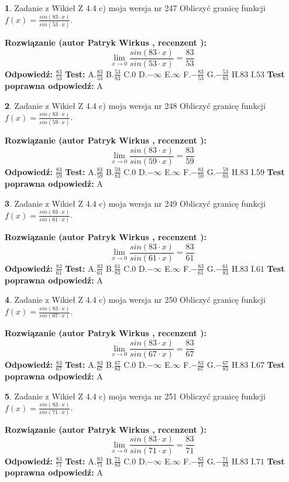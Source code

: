 \documentclass[12pt, a4paper]{article}
\theoremstyle{definition} %
\newtheorem{zad}{}
\newcommand{\zadStart}[1]{\begin{zad}#1\newline}
\newcommand{\zadStop}{\end{zad}}
\newcommand{\rozwStart}[2]{\noindent \textbf{Rozwiązanie (autor #1 , recenzent #2): }\newline}
\newcommand{\rozwStop}{\newline}
\newcommand{\odpStart}{\noindent \textbf{Odpowiedź:}\newline}
\newcommand{\odpStop}{\newline}
\newcommand{\testStart}{\noindent \textbf{Test:}\newline}
\newcommand{\testStop}{\newline}
\newcommand{\kluczStart}{\noindent \textbf{Test poprawna odpowiedź:}\newline}
\newcommand{\kluczStop}{\newline}
\begin{document}
\zadStart{Zadanie z Wikieł Z 4.4 c) moja wersja nr 247}
Obliczyć granicę funkcji $f(x)=\frac{sin(83\cdot x)}{sin(53\cdot x)}$.
\zadStop
\rozwStart{Patryk Wirkus}{}
$$\lim\limits_{x\to 0}\frac{sin(83\cdot x)}{sin(53\cdot x)}=
\frac{83}{53}$$
\rozwStop
\odpStart
$\frac{83}{53}$
\odpStop
\testStart
A.$\frac{83}{53}$
B.$\frac{53}{83}$
C.$0$
D.$-\infty$
E.$\infty$
F.$-\frac{83}{53}$
G.$-\frac{53}{83}$
H.$83$
I.$53$
\testStop
\kluczStart
A
\kluczStop



\zadStart{Zadanie z Wikieł Z 4.4 c) moja wersja nr 248}
Obliczyć granicę funkcji $f(x)=\frac{sin(83\cdot x)}{sin(59\cdot x)}$.
\zadStop
\rozwStart{Patryk Wirkus}{}
$$\lim\limits_{x\to 0}\frac{sin(83\cdot x)}{sin(59\cdot x)}=
\frac{83}{59}$$
\rozwStop
\odpStart
$\frac{83}{59}$
\odpStop
\testStart
A.$\frac{83}{59}$
B.$\frac{59}{83}$
C.$0$
D.$-\infty$
E.$\infty$
F.$-\frac{83}{59}$
G.$-\frac{59}{83}$
H.$83$
I.$59$
\testStop
\kluczStart
A
\kluczStop



\zadStart{Zadanie z Wikieł Z 4.4 c) moja wersja nr 249}
Obliczyć granicę funkcji $f(x)=\frac{sin(83\cdot x)}{sin(61\cdot x)}$.
\zadStop
\rozwStart{Patryk Wirkus}{}
$$\lim\limits_{x\to 0}\frac{sin(83\cdot x)}{sin(61\cdot x)}=
\frac{83}{61}$$
\rozwStop
\odpStart
$\frac{83}{61}$
\odpStop
\testStart
A.$\frac{83}{61}$
B.$\frac{61}{83}$
C.$0$
D.$-\infty$
E.$\infty$
F.$-\frac{83}{61}$
G.$-\frac{61}{83}$
H.$83$
I.$61$
\testStop
\kluczStart
A
\kluczStop



\zadStart{Zadanie z Wikieł Z 4.4 c) moja wersja nr 250}
Obliczyć granicę funkcji $f(x)=\frac{sin(83\cdot x)}{sin(67\cdot x)}$.
\zadStop
\rozwStart{Patryk Wirkus}{}
$$\lim\limits_{x\to 0}\frac{sin(83\cdot x)}{sin(67\cdot x)}=
\frac{83}{67}$$
\rozwStop
\odpStart
$\frac{83}{67}$
\odpStop
\testStart
A.$\frac{83}{67}$
B.$\frac{67}{83}$
C.$0$
D.$-\infty$
E.$\infty$
F.$-\frac{83}{67}$
G.$-\frac{67}{83}$
H.$83$
I.$67$
\testStop
\kluczStart
A
\kluczStop



\zadStart{Zadanie z Wikieł Z 4.4 c) moja wersja nr 251}
Obliczyć granicę funkcji $f(x)=\frac{sin(83\cdot x)}{sin(71\cdot x)}$.
\zadStop
\rozwStart{Patryk Wirkus}{}
$$\lim\limits_{x\to 0}\frac{sin(83\cdot x)}{sin(71\cdot x)}=
\frac{83}{71}$$
\rozwStop
\odpStart
$\frac{83}{71}$
\odpStop
\testStart
A.$\frac{83}{71}$
B.$\frac{71}{83}$
C.$0$
D.$-\infty$
E.$\infty$
F.$-\frac{83}{71}$
G.$-\frac{71}{83}$
H.$83$
I.$71$
\testStop
\kluczStart
A
\kluczStop
\end{document}
